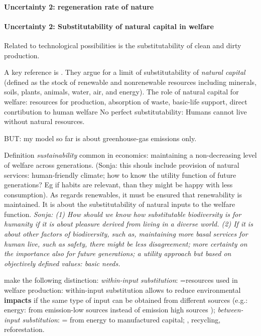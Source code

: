 \paragraph{Uncertainty 2: regeneration rate of nature}

\paragraph{Uncertainty 2: Substitutability of natural capital in welfare}
Related to technological possibilities is the substitutability of clean and dirty production. 

A key reference is \cite{Cohen2019AnnualSubstitutable}. They argue for a limit of substitutability of \textit{natural capital} (defined as the stock of renewable and nonrenewable resources including minerals, soils, plants, animals, water, air, and energy). The role of natural capital for welfare: resources for production, absorption of waste, basic-life support, direct conrtibution to human welfare \ar No perfect substitutability: Humans cannot live without natural resources. 

BUT: my model so far is about greenhouse-gas emissions only.

Definition \textit{sustainability} common in economics: maintaining a non-decreasing level of welfare across generations. (Sonja: this shouls include provision of natural services: human-friendly climate; how to know the utility function of future generations? Eg if habits are relevant, than they might be happy with less consumption). As regards renewables, it must be ensured that renewability is maintained. It is about the substitutability of natural inputs to the welfare function. \textit{Sonja: (1) How should we know how substitutable biodiversity is for humanity if it is about pleasure derived from living in a diverse world. (2) If it is about other factors of biodiversity, such as, maintaining more basal services for human live, such as safety, there might be less disagreement; more certainty on the importance also for future generations; a utility approach but based on objectively defined values: basic needs.}

\cite{Cohen2019AnnualSubstitutable} make the following distinction: \textit{within-input substitution}: =resources used in welfare production: within-input substitution allows to reduce environmental \textbf{impacts} if the same type of input can be obtained from different sources (e.g.: energy: from emission-low sources instead of emission high sources ); \textit{between-input substitution}: = from energy to manufactured capital; , recycling, reforestation.

